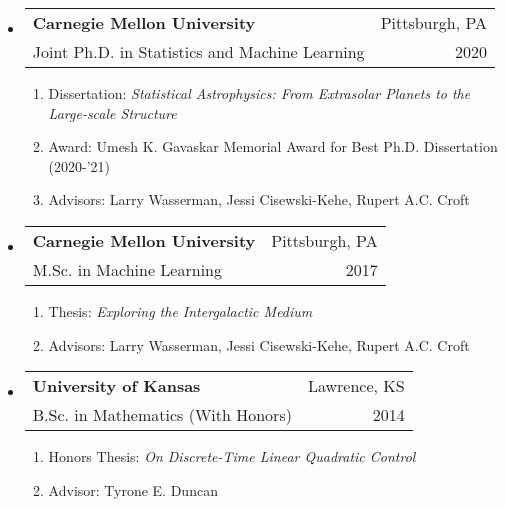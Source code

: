 \documentclass[letterpaper,10pt]{article}
\makeatletter
\newcommand{\subheadingtwolines}[4]{
\begin{tabular*}{6.45in}{l@{\cftdotfill{\cftsecdotsep}\extracolsep{\fill}}r}
#1 & #2 \\
#3 & #4 \\
\end{tabular*}}
\makeatother
\begin{document}
\begin{itemize}[leftmargin=0.4cm, itemsep=0.3cm]
\item[] \subheadingtwolines{{\bf Carnegie Mellon University}}{Pittsburgh, PA}{Joint Ph.D. in Statistics and Machine Learning}{2020}
\vspace{-0.1cm}
\begin{enumerate}[itemsep=0.02cm]
	\item[] \hspace{-2ex}Dissertation: {\it Statistical Astrophysics: From Extrasolar Planets to the Large-scale Structure}\\
	\vspace{-.02cm}
	\hspace{11.17ex}{\it of the Universe}
	\item[] \hspace{-2ex}Award: Umesh K. Gavaskar Memorial Award for Best Ph.D. Dissertation (2020-'21)
	\item[] \hspace{-2ex}Advisors: Larry Wasserman, Jessi Cisewski-Kehe, Rupert A.C. Croft
\end{enumerate}

\item[] \subheadingtwolines{{\bf Carnegie Mellon University}}{Pittsburgh, PA}{M.Sc. in Machine Learning}{2017}
\vspace{-0.1cm}
\begin{enumerate}
	\item[] \hspace{-2ex}Thesis: {\it Exploring the Intergalactic Medium}
		\vspace{-.05cm}
	\item[] \hspace{-2ex}Advisors: Larry Wasserman, Jessi Cisewski-Kehe, Rupert A.C. Croft
\end{enumerate}

\item[] \subheadingtwolines{{\bf University of Kansas}}{Lawrence, KS}{B.Sc. in Mathematics (With Honors)}{2014}
\vspace{-0.1cm}
\begin{enumerate}
	\item[] \hspace{-2ex}Honors Thesis: {\it On Discrete-Time Linear Quadratic Control}
		\vspace{-.05cm}
	\item[] \hspace{-2ex}Advisor: Tyrone E. Duncan
\end{enumerate}
\end{itemize}
\end{document}
